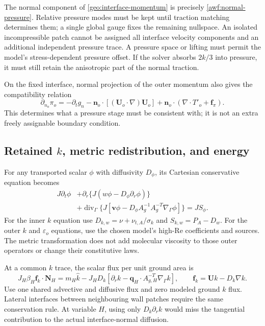 \documentclass[11pt,a4paper]{article}
\numberwithin{equation}{section}
\newcommand{\eps}{\varepsilon}
\begin{document}
The normal component of \cref{geo:interface-momentum} is precisely
\cref{awf:normal-pressure}.  Relative pressure modes must be kept
until traction matching determines them; a single global gauge
fixes the remaining nullspace.  An isolated incompressible patch
cannot be assigned all interface velocity components and an
additional independent pressure trace.  A pressure space or lifting
must permit the model's stress-dependent pressure offset.  If the
solver absorbs $2k/3$ into pressure, it must still retain the
anisotropic part of the normal traction.

On the fixed interface, normal projection of the outer momentum
also gives the compatibility relation
\begin{equation}
 \partial_{n_o}\pi_o=-\partial_tg_n
 -\boldsymbol n_o\cdot[(\boldsymbol U_o\cdot\nabla)\boldsymbol U_o]
 +\boldsymbol n_o\cdot(\nabla\cdot T'_o+\boldsymbol f_\pi).
 \label{geo:pressure-compatibility}
\end{equation}
This determines what a pressure stage must be consistent with;
it is not an extra freely assignable boundary condition.

\subsection{Retained \texorpdfstring{$k$}{k}, metric redistribution, and energy}

For any transported scalar $\phi$ with diffusivity $D_\phi$, its
Cartesian conservative equation becomes
\begin{equation}
 \begin{aligned}
 J\partial_t\phi
 &+\partial_r\{J(w\phi-D_\phi\partial_r\phi)\}\\
 &+\operatorname{div}_\Gamma\{J[
       \boldsymbol v\phi-D_\phi A_g^{-1}A_g^{-T}
                                  \nabla_\Gamma\phi]\}
 =JS_\phi .
 \end{aligned}
 \label{geo:scalar}
\end{equation}
For the inner $k$ equation use $D_{k,w}=\nu+\nu_{t,A}/\sigma_k$
and $S_{k,w}=P_A-D_w$.  For the outer $k$ and $\eps_o$ equations,
use the chosen model's high-Re coefficients and sources.  The metric
transformation does not add molecular viscosity to those outer
operators or change their constitutive laws.

At a common $k$ trace, the scalar flux per unit ground area is
\begin{equation}
 \boxed{J_H\beta_H\boldsymbol f_k\cdot\boldsymbol N_H
 =m_H\widehat k-J_HD_k\left[
 \partial_rk-\boldsymbol q_H\cdot A_{g,H}^{-T}
                                   \nabla_\Gamma k\right],
 \qquad \boldsymbol f_k=\boldsymbol U k-D_k\nabla k.}
 \label{geo:k-flux}
\end{equation}
Use one shared advective and diffusive flux and zero modeled ground
$k$ flux.  Lateral interfaces between neighbouring wall patches
require the same conservation rule.  At variable $H$, using only
$D_k\partial_rk$ would miss the tangential contribution to the
actual interface-normal diffusion.
\end{document}
